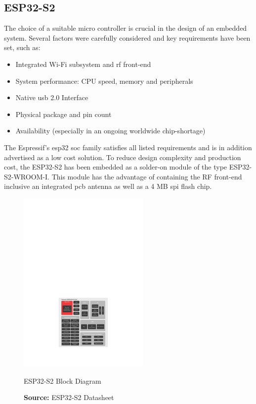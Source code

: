 \subsection{ESP32-S2}
The choice of a suitable micro controller is crucial in the design of an embedded system. Several factors were carefully considered and key requirements have been set, such as:

\begin{itemize}
		\item Integrated Wi-Fi subsystem and \acrshort{rf} front-end
		\item System performance: CPU speed, memory and peripherals
		\item Native \acrshort{usb} 2.0 Interface
		\item Physical package and pin count
		\item Availability (especially in an ongoing worldwide chip-shortage)
\end{itemize}

The Espressif's \gls{esp32} \acrfull{soc} family satisfies all listed requirements and is in addition advertised as a low cost solution.\newline
To reduce design complexity and production cost, the ESP32-S2 has been embedded as a solder-on module of the type ESP32-S2-WROOM-I. This module has the advantage of containing the RF front-end inclusive an integrated \acrshort{pcb} antenna as well as a 4 MB \acrshort{spi} flash chip.

\begin{figure}[h!]
	\centering
	\includegraphics[height=9cm]{images/esp32-s2_block_diagram}
	\caption{ESP32-S2 Block Diagram}
	\vspace{-1.4ex}
	\caption*{\textbf{Source:} ESP32-S2 Datasheet \cite{esp32-s2_datasheet}}
	\label{fig:esp32-s2_block_diagram}
\end{figure}

